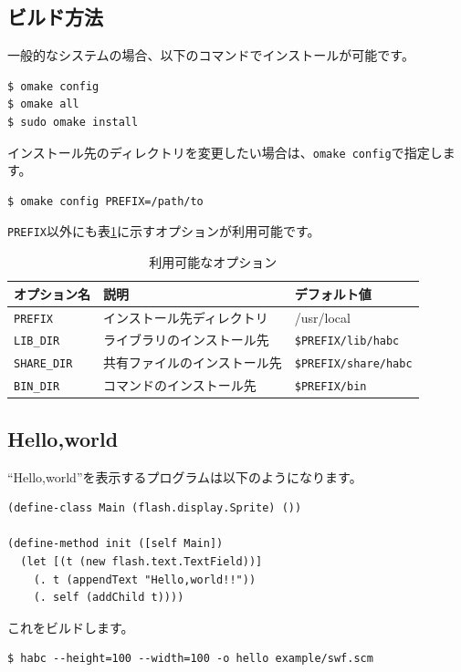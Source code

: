 \documentclass{article}
\begin{document}
\subsection{ビルド方法}
一般的なシステムの場合、以下のコマンドでインストールが可能です。
\begin{verbatim}
$ omake config
$ omake all
$ sudo omake install
\end{verbatim}

インストール先のディレクトリを変更したい場合は、\verb!omake config!で指定します。

\begin{verbatim}
$ omake config PREFIX=/path/to
\end{verbatim}

\verb!PREFIX!以外にも表\ref{option}に示すオプションが利用可能です。

\begin{table}
\centering
\caption{利用可能なオプション}\label{option}
\begin{tabular}{|l|l|l|}
\hline
オプション名     & 説明 & デフォルト値 \\\hline
\verb!PREFIX!    & インストール先ディレクトリ & /usr/local \\
\verb!LIB_DIR!   & ライブラリのインストール先 & \verb!$PREFIX/lib/habc! \\
\verb!SHARE_DIR! & 共有ファイルのインストール先 & \verb!$PREFIX/share/habc! \\
\verb!BIN_DIR!   & コマンドのインストール先     & \verb!$PREFIX/bin! \\
\hline
\end{tabular}
\end{table}

\subsection{Hello,world}

``Hello,world''を表示するプログラムは以下のようになります。
\begin{verbatim}
(define-class Main (flash.display.Sprite) ())

(define-method init ([self Main])
  (let [(t (new flash.text.TextField))]
    (. t (appendText "Hello,world!!"))
    (. self (addChild t))))
\end{verbatim}

これをビルドします。
\begin{verbatim}
$ habc --height=100 --width=100 -o hello example/swf.scm
\end{verbatim}
\end{document}
